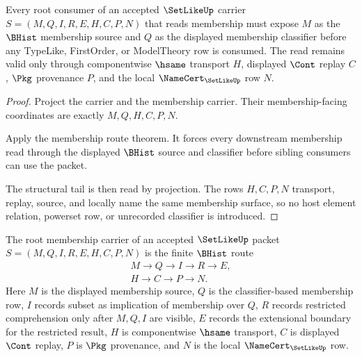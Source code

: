 \begin{theorem}
\label{thm:setlike-kernel-membership-obligation}
Every root consumer of an accepted $\SetLikeUp$ carrier $S=(M,Q,I,R,E,H,C,P,N)$ that reads membership must expose $M$ as the $\BHist$ membership source and $Q$ as the displayed membership classifier before any TypeLike, FirstOrder, or ModelTheory row is consumed. The read remains valid only through componentwise $\hsame$ transport $H$, displayed $\Cont$ replay $C$, $\Pkg$ provenance $P$, and the local $\NameCert_{\SetLikeUp}$ row $N$.
\end{theorem}
\begin{proof}
Project the carrier and the membership carrier. Their membership-facing coordinates are exactly $M,Q,H,C,P,N$.

Apply the membership route theorem. It forces every downstream membership read through the displayed $\BHist$ source and classifier before sibling consumers can use the packet.

The structural tail is then read by projection. The rows $H,C,P,N$ transport, replay, source, and locally name the same membership surface, so no host element relation, powerset row, or unrecorded classifier is introduced.
\end{proof}

\begin{definition}
\label{def:setlike-root-membership-carrier}
The root membership carrier of an accepted $\SetLikeUp$ packet $S=(M,Q,I,R,E,H,C,P,N)$ is the finite $\BHist$ route
$$
\begin{gathered}
M \longrightarrow Q \longrightarrow I \longrightarrow R \longrightarrow E,\\
H \longrightarrow C \longrightarrow P \longrightarrow N .
\end{gathered}
$$
Here $M$ is the displayed membership source, $Q$ is the classifier-based membership row, $I$ records subset as implication of membership over $Q$, $R$ records restricted comprehension only after $M,Q,I$ are visible, $E$ records the extensional boundary for the restricted result, $H$ is componentwise $\hsame$ transport, $C$ is displayed $\Cont$ replay, $P$ is $\Pkg$ provenance, and $N$ is the local $\NameCert_{\SetLikeUp}$ row.
\end{definition}

